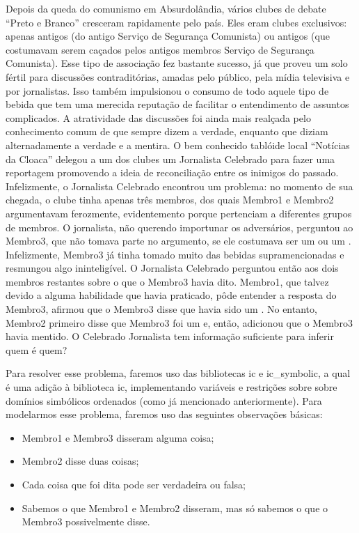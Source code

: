 Depois da queda do comunismo em Absurdolândia, vários clubes de debate ``Preto e Branco''
cresceram rapidamente pelo país. Eles eram clubes exclusivos: apenas antigos  (do antigo Serviço de Segurança Comunista) ou antigos 
(que costumavam serem caçados pelos antigos membros Serviço de Segurança Comunista). Esse tipo de
associação fez bastante sucesso, já que proveu um solo fértil para discussões contraditórias, amadas
pelo público, pela mídia televisiva e por jornalistas. Isso também impulsionou o consumo de todo
aquele tipo de bebida que tem uma merecida reputação de facilitar o entendimento de assuntos
complicados. A atratividade das discussões foi ainda mais realçada pelo conhecimento comum de que
 sempre dizem a verdade, enquanto que  diziam alternadamente a verdade e a mentira. O bem conhecido tablóide local ``Notícias
da Cloaca'' delegou a um dos clubes um Jornalista Celebrado para fazer uma reportagem promovendo a
ideia de reconciliação entre os inimigos do passado. Infelizmente, o Jornalista Celebrado encontrou um
problema: no momento de sua chegada, o clube tinha apenas três membros, dos quais Membro1 e Membro2
argumentavam ferozmente, evidentemento porque pertenciam a diferentes grupos de membros. O
jornalista, não querendo importunar os adversários, perguntou ao Membro3, que não tomava parte no
argumento, se ele costumava ser um  ou um . Infelizmente, Membro3 já tinha tomado muito das bebidas supramencionadas e resmungou algo
ininteligível. O Jornalista Celebrado perguntou então aos dois membros restantes sobre o que o
Membro3 havia dito. Membro1, que talvez devido a alguma habilidade que havia praticado, pôde
entender a resposta do Membro3, afirmou que o Membro3 disse que havia sido um
. No entanto, Membro2 primeiro disse que Membro3 foi um
 e, então, adicionou que o Membro3 havia mentido. O Celebrado
Jornalista tem informação suficiente para inferir quem é quem?

Para resolver esse problema, faremos uso das bibliotecas ic e ic\_symbolic, a qual é uma adição à
biblioteca ic, implementando variáveis e restrições sobre sobre domínios simbólicos ordenados (como
já mencionado anteriormente). Para modelarmos esse problema, faremos uso das seguintes observações
básicas:

\begin{itemize}
  \item Membro1 e Membro3 disseram alguma coisa;
  \item Membro2 disse duas coisas;
  \item Cada coisa que foi dita pode ser verdadeira ou falsa;
  \item Sabemos o que Membro1 e Membro2 disseram, mas só sabemos o que o Membro3 possivelmente
    disse.
\end{itemize}


